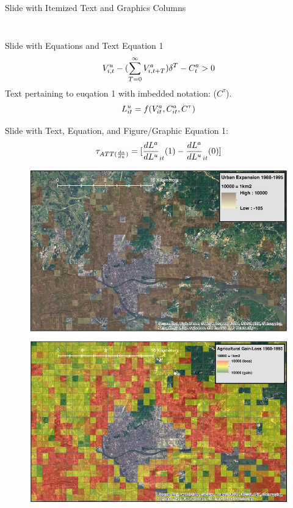 \documentclass[newPxFont]{beamer}
\begin{document}
\begin{frame}[c]{Slide with Itemized Text and Graphics Columns}
\begin{columns}
\begin{column}{.6\linewidth}
\begin{figure}
			\end{figure}
		\end{column}
	\end{columns}
\end{frame}


\begin{frame}{Slide with Equations and Text}
	Equation 1
	\begin{equation}{\label{eq1}}
	V_{i,t}^{u}-(\sum\limits_{T=0}^{\infty}V_{i,t+T}^{a})\delta^{T}-C_{t}^{a}>0   
	\end{equation}
	Text pertaining to euqation 1 with imbedded notation: ($C^{\tau}$).
	\begin{equation}{\label{eq2}}
	L_{it}^{u}=f(V_{it}^{a},C_{it}^{a},C^{\tau})
	\end{equation}
\end{frame}


\begin{frame}{Slide with Text, Equation, and Figure/Graphic}
	Equation 1:
	\begin{equation}{\label{eq2}}
		\tau_{ATT(\frac{da}{du})}=[\frac{dL^{a}}{dL^{u}}_{it}(1)-\frac{dL^{a}}{dL^{u}}_{it}(0)]
	\end{equation}
	\begin{figure}
		\centering
		\includegraphics[width=0.6\linewidth, trim=0 0 0 400, clip]{CompareHiRes_Guangzhou.eps}
	\end{figure}
\end{frame}
\end{document}
